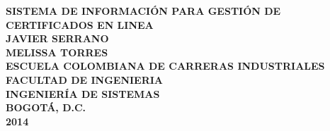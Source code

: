 \begin{titlepage}
\setlength{\parindent}{0pt} \setlength{\parskip}{0pt}

\begin{center}

\textbf{SISTEMA DE INFORMACI\'ON PARA GESTI\'ON DE CERTIFICADOS EN LINEA\\[8cm] JAVIER SERRANO\\ MELISSA TORRES}\\[9cm]



\textbf{ESCUELA COLOMBIANA DE CARRERAS INDUSTRIALES\\FACULTAD DE INGENIERIA\\INGENIER\'IA DE SISTEMAS\\BOGOT\'A, D.C.\\2014}
\end{center}
\end{titlepage}